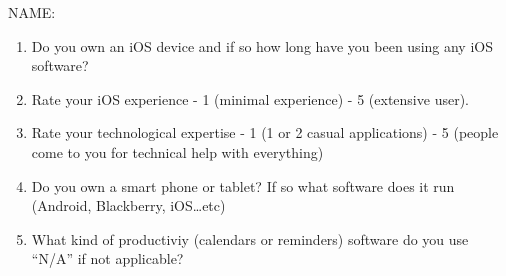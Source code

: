 \documentclass{article}
\begin{document}
\rhead{}

{\large NAME:}
\vspace{1cm}
\begin{enumerate}
        \setlength{\itemsep}{2cm}
    \item Do you own an iOS device and if so how long have you been using any iOS software?
    \item Rate your iOS experience -  1 (minimal experience) - 5 (extensive user).
    \item Rate your technological expertise  - 1 (1 or 2 casual applications) - 5 (people come to you for technical help with everything)
    \item Do you own a smart phone or tablet? If so what software does it run (Android, Blackberry, iOS\ldots etc)
    \item What kind of productiviy (calendars or reminders) software do you use ``N/A'' if not applicable?
    
\end{enumerate}
\end{document}
